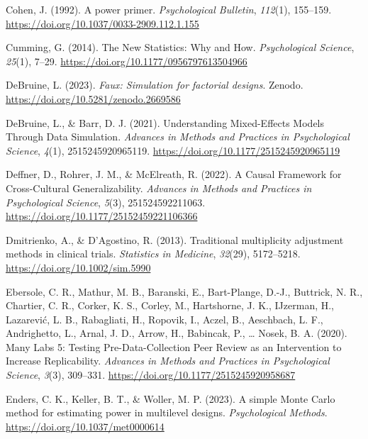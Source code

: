 \documentclass[
  man,
  floatsintext,
  longtable,
  a4paper,
  nolmodern,
  notxfonts,
  notimes,
  colorlinks=true,linkcolor=blue,citecolor=blue,urlcolor=blue]{apa7}
\newlength{\cslhangindent}
\newenvironment{CSLReferences}[2] %
 {\begin{list}{}{%
  \setlength{\itemindent}{0pt}
  \setlength{\leftmargin}{0pt}
  \setlength{\parsep}{0pt}
  \ifodd #1
   \setlength{\leftmargin}{\cslhangindent}
   \setlength{\itemindent}{-1\cslhangindent}
  \fi
  \setlength{\itemsep}{#2\baselineskip}}}
 {\end{list}}
\begin{document}
\begin{CSLReferences}{1}{0}
Cohen, J. (1992). A power primer. \emph{Psychological Bulletin},
\emph{112}(1), 155--159.
\url{https://doi.org/10.1037/0033-2909.112.1.155}

Cumming, G. (2014). The {New Statistics}: {Why} and {How}.
\emph{Psychological Science}, \emph{25}(1), 7--29.
\url{https://doi.org/10.1177/0956797613504966}

DeBruine, L. (2023). \emph{Faux: Simulation for factorial designs}.
Zenodo. \url{https://doi.org/10.5281/zenodo.2669586}

DeBruine, L., \& Barr, D. J. (2021). Understanding {Mixed-Effects Models
Through Data Simulation}. \emph{Advances in Methods and Practices in
Psychological Science}, \emph{4}(1), 2515245920965119.
\url{https://doi.org/10.1177/2515245920965119}

Deffner, D., Rohrer, J. M., \& McElreath, R. (2022). A {Causal
Framework} for {Cross-Cultural Generalizability}. \emph{Advances in
Methods and Practices in Psychological Science}, \emph{5}(3),
251524592211063. \url{https://doi.org/10.1177/25152459221106366}

Dmitrienko, A., \& D'Agostino, R. (2013). Traditional multiplicity
adjustment methods in clinical trials. \emph{Statistics in Medicine},
\emph{32}(29), 5172--5218. \url{https://doi.org/10.1002/sim.5990}

Ebersole, C. R., Mathur, M. B., Baranski, E., Bart-Plange, D.-J.,
Buttrick, N. R., Chartier, C. R., Corker, K. S., Corley, M., Hartshorne,
J. K., IJzerman, H., Lazarević, L. B., Rabagliati, H., Ropovik, I.,
Aczel, B., Aeschbach, L. F., Andrighetto, L., Arnal, J. D., Arrow, H.,
Babincak, P., \ldots{} Nosek, B. A. (2020). Many {Labs} 5: {Testing
Pre-Data-Collection Peer Review} as an {Intervention} to {Increase
Replicability}. \emph{Advances in Methods and Practices in Psychological
Science}, \emph{3}(3), 309--331.
\url{https://doi.org/10.1177/2515245920958687}

Enders, C. K., Keller, B. T., \& Woller, M. P. (2023). A simple {Monte
Carlo} method for estimating power in multilevel designs.
\emph{Psychological Methods}. \url{https://doi.org/10.1037/met0000614}


\end{CSLReferences}
\end{document}
